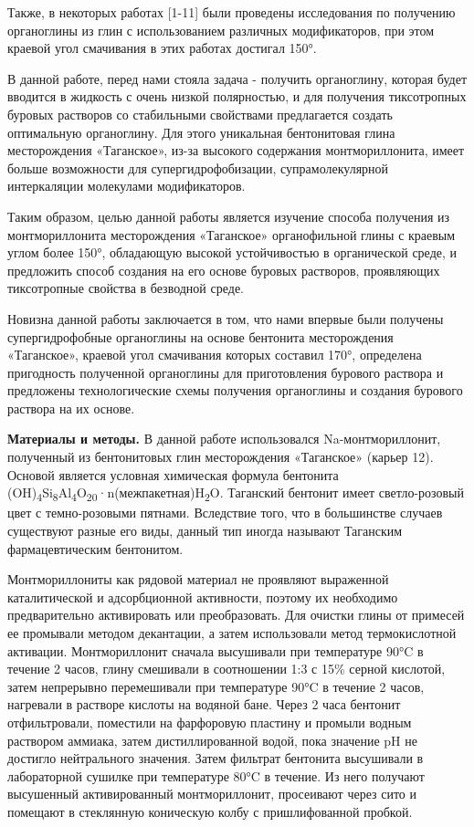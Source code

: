 \begin{multicols}{2}
Также, в некоторых работах {[}1-11{]} были проведены исследования по
получению органоглины из глин с использованием различных модификаторов,
при этом краевой угол смачивания в этих работах достигал 150°.

В данной работе, перед нами стояла задача - получить органоглину,
которая будет вводится в жидкость с очень низкой полярностью, и для
получения тиксотропных буровых растворов со стабильными свойствами
предлагается создать оптимальную органоглину. Для этого уникальная
бентонитовая глина месторождения «Таганское», из-за высокого содержания
монтмориллонита, имеет больше возможности для супергидрофобизации,
супрамолекулярной интеркаляции молекулами модификаторов.

Таким образом, целью данной работы является изучение способа получения
из монтмориллонита месторождения «Таганское» органофильной глины с
краевым углом более 150°, обладающую высокой устойчивостью в
органической среде, и предложить способ создания на его основе буровых
растворов, проявляющих тиксотропные свойства в безводной среде.

Новизна данной работы заключается в том, что нами впервые были получены
супергидрофобные органоглины на основе бентонита месторождения
«Таганское», краевой угол смачивания которых составил 170°, определена
пригодность полученной органоглины для приготовления бурового раствора и
предложены технологические схемы получения органоглины и создания
бурового раствора на их основе.

{\bfseries Материалы и методы.} В данной работе использовался
Na-монтмориллонит, полученный из бентонитовых глин месторождения
«Таганское» (карьер 12). Основой является условная химическая формула
бентонита
(OH)\textsubscript{4}Si\textsubscript{8}Al\textsubscript{4}O\textsubscript{20}·n(межпакетная)H\textsubscript{2}O.
Таганский бентонит имеет светло-розовый цвет с темно-розовыми пятнами.
Вследствие того, что в большинстве случаев существуют разные его виды,
данный тип иногда называют Таганским фармацевтическим бентонитом.

Монтмориллониты как рядовой материал не проявляют выраженной
каталитической и адсорбционной активности, поэтому их необходимо
предварительно активировать или преобразовать. Для очистки глины от
примесей ее промывали методом декантации, а затем использовали метод
термокислотной активации. Монтмориллонит сначала высушивали при
температуре 90°C в течение 2 часов, глину смешивали в соотношении 1:3 с
15\% серной кислотой, затем непрерывно перемешивали при температуре 90°C
в течение 2 часов, нагревали в растворе кислоты на водяной бане. Через 2
часа бентонит отфильтровали, поместили на фарфоровую пластину и промыли
водным раствором аммиака, затем дистиллированной водой, пока значение pH
не достигло нейтрального значения. Затем фильтрат бентонита высушивали в
лабораторной сушилке при температуре 80°C в течение. Из него получают
высушенный активированный монтмориллонит, просеивают через сито и
помещают в стеклянную коническую колбу с пришлифованной пробкой.
\end{multicols}

